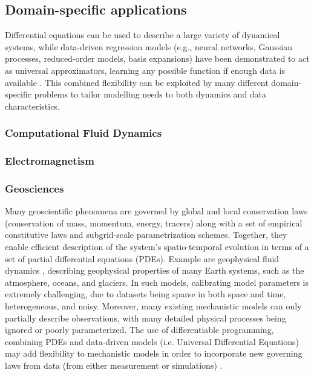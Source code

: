\subsection{Domain-specific applications}

Differential equations can be used to describe a large variety of dynamical systems, while data-driven regression models (e.g., neural networks, Gaussian processes, reduced-order models, basis expansions) have been demonstrated to act as universal approximators, learning any possible function if enough data is available \cite{gorban_1998}. 
This combined flexibility can be exploited by many different domain-specific problems to tailor modelling needs to both dynamics and data characteristics.

\subsubsection{Computational Fluid Dynamics}

\subsubsection{Electromagnetism}

\subsubsection{Geosciences}

Many geoscientific phenomena are governed by global and local conservation laws (conservation of mass, momentum, energy, tracers) along with a set of empirical constitutive laws and subgrid-scale parametrization schemes. 
Together, they enable efficient description of the system's spatio-temporal evolution in terms of a set of partial differential equations (PDEs).
Example are geophysical fluid dynamics \cite{Vallis:2016kv}, describing geophysical properties of many Earth systems, such as the atmosphere, oceans, and glaciers.
In such models, calibrating model parameters is extremely challenging, due to datasets being sparse in both space and time, heterogeneous, and noisy.
Moreover, many existing mechanistic models can only partially describe observations, with many detailed physical processes being ignored or poorly parameterized. 
The use of differentiable programming, combining PDEs and data-driven models (i.e. Universal Differential Equations) may add flexibility to mechanistic models in order to incorporate new governing laws from data (from either measurement or simulations) \cite{rackauckas2020universal}.

